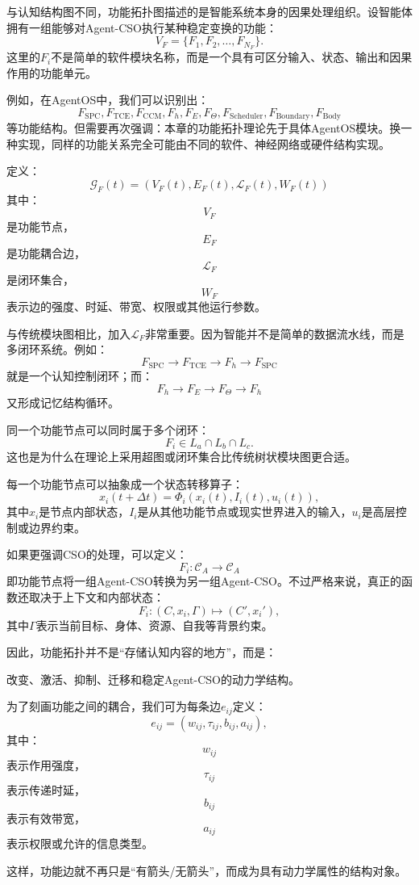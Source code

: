 与认知结构图不同，功能拓扑图描述的是智能系统本身的因果处理组织。设智能体拥有一组能够对Agent-CSO执行某种稳定变换的功能：
\[
V_F
=
\{
F_1,F_2,\ldots,F_{N_F}
\}.
\]
这里的$F_i$不是简单的软件模块名称，而是一个具有可区分输入、状态、输出和因果作用的功能单元。

例如，在AgentOS中，我们可以识别出：
\[
F_{\text{SPC}},
F_{\text{TCE}},
F_{\text{CCM}},
F_h,
F_E,
F_\Theta,
F_{\text{Scheduler}},
F_{\text{Boundary}},
F_{\text{Body}}
\]
等功能结构。但需要再次强调：本章的功能拓扑理论先于具体AgentOS模块。换一种实现，同样的功能关系完全可能由不同的软件、神经网络或硬件结构实现。

定义：
\[
\boxed{
\mathcal G_F(t)
=
\left(
V_F(t),
E_F(t),
\mathcal L_F(t),
W_F(t)
\right)
}
\]
其中：
\[
V_F
\]
是功能节点，
\[
E_F
\]
是功能耦合边，
\[
\mathcal L_F
\]
是闭环集合，
\[
W_F
\]
表示边的强度、时延、带宽、权限或其他运行参数。

与传统模块图相比，加入$\mathcal L_F$非常重要。因为智能并不是简单的数据流水线，而是多闭环系统。例如：
\[
F_{\text{SPC}}
\rightarrow
F_{\text{TCE}}
\rightarrow
F_h
\rightarrow
F_{\text{SPC}}
\]
就是一个认知控制闭环；而：
\[
F_h
\rightarrow
F_E
\rightarrow
F_\Theta
\rightarrow
F_h
\]
又形成记忆结构循环。

同一个功能节点可以同时属于多个闭环：
\[
F_i
\in
L_a\cap L_b\cap L_c.
\]
这也是为什么在理论上采用超图或闭环集合比传统树状模块图更合适。

每一个功能节点可以抽象成一个状态转移算子：
\[
x_i(t+\Delta t)
=
\Phi_i
\left(
x_i(t),
I_i(t),
u_i(t)
\right),
\]
其中$x_i$是节点内部状态，$I_i$是从其他功能节点或现实世界进入的输入，$u_i$是高层控制或边界约束。

如果更强调CSO的处理，可以定义：
\[
\boxed{
F_i:
\mathcal C_A
\rightarrow
\mathcal C_A
}
\]
即功能节点将一组Agent-CSO转换为另一组Agent-CSO。不过严格来说，真正的函数还取决于上下文和内部状态：
\[
F_i:
(C,x_i,\Gamma)
\mapsto
(C',x_i'),
\]
其中$\Gamma$表示当前目标、身体、资源、自我等背景约束。

因此，功能拓扑并不是“存储认知内容的地方”，而是：
\begin{statementbox}
改变、激活、抑制、迁移和稳定Agent-CSO的动力学结构。
\end{statementbox}

为了刻画功能之间的耦合，我们可为每条边$e_{ij}$定义：
\[
e_{ij}
=
(
w_{ij},
\tau_{ij},
b_{ij},
a_{ij}
),
\]
其中：
\[
w_{ij}
\]
表示作用强度，
\[
\tau_{ij}
\]
表示传递时延，
\[
b_{ij}
\]
表示有效带宽，
\[
a_{ij}
\]
表示权限或允许的信息类型。

这样，功能边就不再只是“有箭头/无箭头”，而成为具有动力学属性的结构对象。

